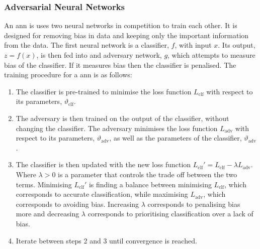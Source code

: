 \documentclass[a4paper]{article}
\begin{document}
    \subsubsection{Adversarial Neural Networks}
    An \gls{ann} is uses two neural networks in competition to train each other.
    It is designed for removing bias in data and keeping only the important information from the data.
    The first neural network is a classifier, \(f\), with input \(x\).
    Its output, \(z = f(x)\), is then fed into and adversary network, \(g\), which attempts to measure bias of the classifier.
    If it measures bias then the classifier is penalised.
    The training procedure for a \gls{ann} is as follows:
    \begin{enumerate}
        \item The classifier is pre-trained to minimise the loss function \(L_{\mathrm{clf}}\) with respect to its parameters, \(\vartheta_{\mathrm{clf}}\).
        \item The adversary is then trained on the output of the classifier, without changing the classifier.
        The adversary minimises the loss function \(L_{\mathrm{adv}}\) with respect to its parameters, \(\vartheta_{\mathrm{adv}}\), as well as the parameters of the classifier, \(\vartheta_{\mathrm{adv}}\).
        \item The classifier is then updated with the new loss function \(L_{\mathrm{clf}}' = L_{\mathrm{clf}} - \lambda L_{\mathrm{adv}}\).
        Where \(\lambda > 0\) is a parameter that controls the trade off between the two terms.
        Minimising \(L_{\mathrm{clf}}'\) is finding a balance between minimising \(L_{\mathrm{clf}}\), which corresponds to accurate classification, while maximising \(L_{\mathrm{adv}}\), which corresponds to avoiding bias.
        Increasing \(\lambda\) corresponds to penalising bias more and decreasing \(\lambda\) corresponds to prioritising classification over a lack of bias.
        \item Iterate between steps 2 and 3 until convergence is reached.
    \end{enumerate}
    
\end{document}
